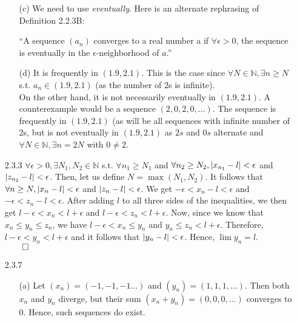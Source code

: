 \documentclass[11pt]{article}
\DeclarePairedDelimiter\abs{\lvert}{\rvert}%
\newcommand{\nats}{\mathbb{N}}
\begin{document}
\begin{itemize}
\begin{itemize}
            \item[(c)]
                We need to use \textit{eventually}. Here is an alternate
                rephrasing of Definition 2.2.3B:

                ``A sequence $(a_n)$ converges to a real number a if $\forall
                \epsilon > 0$, the sequence is eventually in the
                $\epsilon$-neighborhood of $a$.''

            \item[(d)]
                It is frequently in $(1.9, 2.1)$. This is the case since
                $\forall N \in \nats, \exists n \geq N$ s.t. $a_n \in (1.9,
                2.1)$ (as the number of $2$s is infinite).\\
                On the other hand, it is not necessarily eventually in $(1.9,
                2.1)$. A counterexample would be a sequence $(2, 0, 2, 0,
                \dots)$. The sequence is frequently in $(1.9, 2.1)$ (as will be
                all sequences with infinite number of $2$s, but is not
                eventually in $(1.9, 2.1)$ as $2s$ and $0s$ alternate and
                $\forall N \in \nats, \exists n = 2N$ with $0
                \neq 2$.
        \end{itemize}

    \item[2.3.3]
        $\forall \epsilon > 0, \exists N_1, N_2 \in \nats$ s.t. $\forall n_1
        \geq N_1$ and $\forall n_2 \geq N_2, \abs{x_{n_1} - l} < \epsilon$ and
        $\abs{z_{n_2} - l} < \epsilon$. Then, let us define $N = \max{(N_1,
        N_2)}$. It follows that $\forall n \geq N, \abs{x_{n} - l} < \epsilon$
        and $\abs{z_{n} - l} < \epsilon$. We get $-\epsilon < x_n - l <
        \epsilon$ and $-\epsilon < z_n - l < \epsilon$. After adding $l$ to
        all three sides of the inequalities, we then get $l -\epsilon < x_n <
        l + \epsilon$ and $l -\epsilon < z_n  < l + \epsilon$. Now, since we
        know that $x_n \leq y_n \leq z_n$, we have $l - \epsilon < x_n \leq
        y_n$ and $y_n \leq z_n < l + \epsilon$. Therefore, $l - \epsilon < y_n
        < l + \epsilon$ and it follows that $\abs{y_n - l} < \epsilon$. Hence,
        $\lim y_n = l$.\\
        $\qed$

    \item[2.3.7]
        \begin{itemize}
            \item[(a)]
                Let $(x_n) = (-1, -1, -1 \dots)$ and $(y_n) = (1, 1, 1,
                \dots)$. Then both $x_n$ and $y_n$ diverge, but their sum
                $(x_n + y_n) = (0, 0, 0, \dots)$ converges to $0$. Hence,
                such sequences do exist.


\end{itemize}
\end{itemize}
\end{document}
